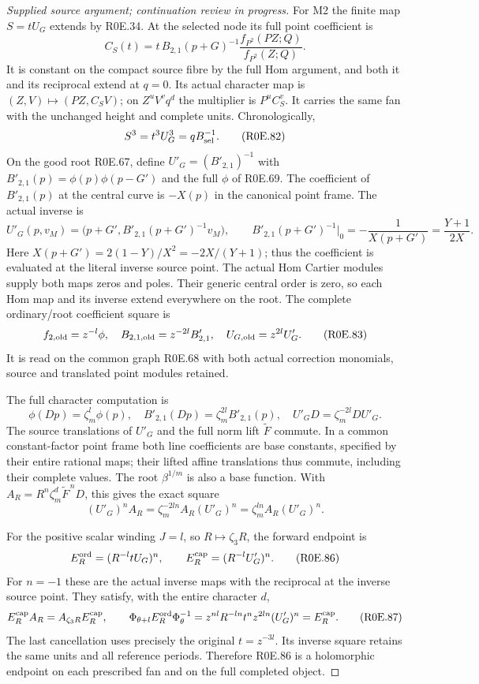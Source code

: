 \begin{proof}[Supplied source argument; continuation review in progress]
For M2 the finite map \(S=tU_G\) extends by R0E.34. At the selected
node its full point coefficient is
\[
 C_S(t)=t\,B_{2,1}(p+G)^{-1}
              \frac{f_{P^2}(PZ;Q)}{f_{P^2}(Z;Q)}.
 \tag{R0E.81}
\]
It is constant on the compact source fibre by the full Hom argument,
and both it and its reciprocal extend at \(q=0\). Its actual
character map is \((Z,V)\mapsto(PZ,C_SV)\); on
\(Z^uV^vq^d\) the multiplier is \(P^uC_S^v\). It carries the same
fan with the unchanged height and complete units. Chronologically,
\[
                    S^3=t^3U_G^3=qB_{\rm sel}^{-1}.
 \tag{R0E.82}
\]
On the good root R0E.67, define \(U'_G=(B'_{2,1})^{-1}\) with
\(B'_{2,1}(p)=\phi(p)\phi(p-G')\) and the full \(\phi\) of
R0E.69. The coefficient of \(B'_{2,1}(p)\) at the central curve is
\(-X(p)\) in the canonical point frame. The actual inverse is
\[
 U'_G(p,v_M)=\bigl(p+G',B'_{2,1}(p+G')^{-1}v_M\bigr),
 \qquad B'_{2,1}(p+G')^{-1}\big|_0
   =-\frac1{X(p+G')}=\frac{Y+1}{2X}.
\]
Here \(X(p+G')=2(1-Y)/X^2=-2X/(Y+1)\); thus the coefficient
is evaluated at the literal inverse source point. The actual
Hom Cartier modules supply both maps\textquotesingle{} zeros and poles. Their
generic central order is zero, so each Hom map and its inverse
extend everywhere on the root. The complete
ordinary/root coefficient square is
\[
 f_{2,\rm old}=z^{-l}\phi,\quad
 B_{2,1,\rm old}=z^{-2l}B'_{2,1},\quad
                     U_{G,\rm old}=z^{2l}U'_G .
 \tag{R0E.83}
\]
It is read on the common graph R0E.68 with both actual correction
monomials, source and translated point modules retained.

The full character computation is
\[
 \phi(Dp)=\zeta_m^l\phi(p),\quad
 B'_{2,1}(Dp)=\zeta_m^{2l}B'_{2,1}(p),\quad
 U'_G D=\zeta_m^{-2l}D U'_G.
 \tag{R0E.84}
\]
The source translations of \(U'_G\) and the full norm lift
\(\widetilde F\) commute. In a common constant-factor point frame
both line coefficients are base constants, specified by their
entire rational maps; their lifted affine translations thus
commute, including their complete values. The root \(\beta^{1/m}\)
is also a base function. With
\(A_R=R^n\zeta_m^d\widetilde F^{\,n}D\), this gives the exact square
\[
       (U'_G)^n A_R=\zeta_m^{-2ln}A_R(U'_G)^n
                    =\zeta_m^{ln}A_R(U'_G)^n .
 \tag{R0E.85}
\]

For the positive scalar winding \(J=l\), so \(R\mapsto\zeta_3R\),
the forward endpoint is
\[
 E_R^{\rm ord}=(R^{-l}tU_G)^n,\qquad
 E_R^{\rm cap}=(R^{-l}U'_G)^n.
 \tag{R0E.86}
\]
For \(n=-1\) these are the actual inverse maps with the reciprocal
at the inverse source point. They satisfy, with the entire
character \(d\),
\[
 E_R^{\rm cap}A_R=A_{\zeta_3R}E_R^{\rm cap},\qquad
 \Phi_{\theta+l}E_R^{\rm ord}\Phi_\theta^{-1}
 =z^{nl}R^{-ln}t^n z^{2ln}(U'_G)^n
 =E_R^{\rm cap}.
 \tag{R0E.87}
\]
The last cancellation uses precisely the original \(t=z^{-3l}\).
Its inverse square retains the same units and all reference
periods. Therefore R0E.86 is a holomorphic endpoint on each
prescribed fan and on the full completed object.


\end{proof}
